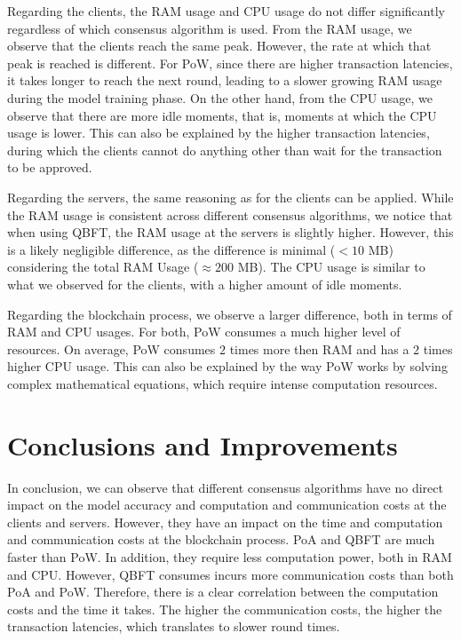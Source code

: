 Regarding the clients, the RAM usage and CPU usage do not differ significantly regardless of which consensus algorithm is used. From the RAM usage, we observe that the clients reach the same peak. However, the rate at which that peak is reached is different. For PoW, since there are higher transaction latencies, it takes longer to reach the next round, leading to a slower growing RAM usage during the model training phase. On the other hand, from the CPU usage, we observe that there are more idle moments, that is, moments at which the CPU usage is lower. This can also be explained by the higher transaction latencies, during which the clients cannot do anything other than wait for the transaction to be approved.

Regarding the servers, the same reasoning as for the clients can be applied. While the RAM usage is consistent across different consensus algorithms, we notice that when using QBFT, the RAM usage at the servers is slightly higher. However, this is a likely negligible difference, as the difference is minimal ($< 10$ MB) considering the total RAM Usage ($\approx 200$ MB). The CPU usage is similar to what we observed for the clients, with a higher amount of idle moments.

Regarding the blockchain process, we observe a larger difference, both in terms of RAM and CPU usages. For both, PoW consumes a much higher level of resources. On average, PoW consumes $2$ times more then RAM and has a $2$ times higher CPU usage. This can also be explained by the way PoW works by solving complex mathematical equations, which require intense computation resources.

\section{Conclusions and Improvements}

In conclusion, we can observe that different consensus algorithms have no direct impact on the model accuracy and computation and communication costs at the clients and servers. However, they have an impact on the time and computation and communication costs at the blockchain process. PoA and QBFT are much faster than PoW. In addition, they require less computation power, both in RAM and CPU. However, QBFT consumes incurs more communication costs than both PoA and PoW. Therefore, there is a clear correlation between the computation costs and the time it takes. The higher the communication costs, the higher the transaction latencies, which translates to slower round times.

